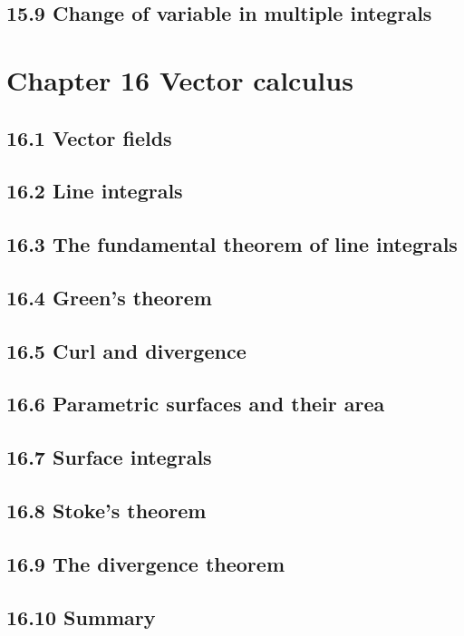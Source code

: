 \documentclass{article}
\begin{document}
\subsection{15.9 Change of variable in multiple integrals}

\section{Chapter 16 Vector calculus}
\subsection{16.1 Vector fields}
\subsection{16.2 Line integrals}
\subsection{16.3 The fundamental theorem of line integrals}
\subsection{16.4 Green's theorem}
\subsection{16.5 Curl and divergence}
\subsection{16.6 Parametric surfaces and their area}
\subsection{16.7 Surface integrals}
\subsection{16.8 Stoke's theorem}
\subsection{16.9 The divergence theorem}
\subsection{16.10 Summary}

\end{document}
